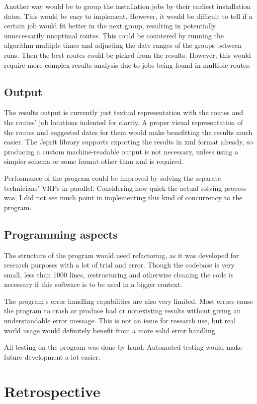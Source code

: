 Another way would be to group the installation jobs by their earliest installation dates. This would be easy to implement. However, it would be difficult to tell if a certain job would fit better in the next group, resulting in potentially unnecessarily unoptimal routes. This could be countered by running the algorithm multiple times and adjusting the date ranges of the groups between runs. Then the best routes could be picked from the results. However, this would require more complex results analysis due to jobs being found in multiple routes. 

\subsection{Output}
The results output is currently just textual representation with the routes and the routes' job locations indented for clarity. A proper visual representation of the routes and suggested dates for them would make benefitting the results much easier. The Jsprit library supports exporting the results in xml format already, so producing a custom machine-readable output is not necessary, unless using a simpler schema or some format other than xml is required.

Performance of the program could be improved by solving the separate technicians' VRPs in parallel. Considering how quick the actual solving process was, I did not see much point in implementing this kind of concurrency to the program. 

\subsection{Programming aspects}
The structure of the program would need refactoring, as it was developed for research purposes with a lot of trial and error. Though the codebase is very small, less than 1000 lines, restructuring and otherwise cleaning the code is necessary if this software is to be used in a bigger context.

The program's error handling capabilities are also very limited. Most errors cause the program to crash or produce bad or nonexisting results without giving an understandable error message. This is not an issue for research use, but real world usage would definitely benefit from a more solid error handling. 

All testing on the program was done by hand. Automated testing would make future development a lot easier.


\section{Retrospective}

